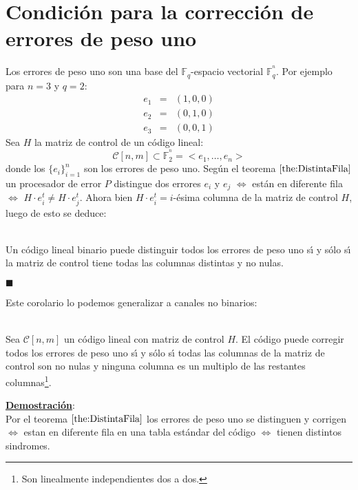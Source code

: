 %
%

\section{Condici\'on para la correcci\'on de errores de peso uno}

Los errores de peso uno son una base del $\mathbb{F}_q$-espacio vectorial
$\mathbb{F}^{^n}_q$. Por ejemplo para $n=3$ y $q=2$:
\begin{eqnarray*}
e_1&=&(1,0,0)\\
e_2&=&(0,1,0)\\
e_3&=&(0,0,1)
\end{eqnarray*}
Sea $H$ la matriz de control de un c\'odigo lineal:
\begin{displaymath}
\mathcal{C}[n,m]\subset \mathbb{F}^{^n}_2 =<e_1,\dots,e_n>
\end{displaymath}
donde los $\{e_i\}_{i=1}^n$ son los errores de peso uno. Seg\'un el teorema
$\ref{the:DistintaFila}$ un procesador de error $P$ distingue dos errores $e_i$
y $e_j$ $\Longleftrightarrow$ est\'an en diferente fila $\Longleftrightarrow$
$H \cdot e_i^t \neq H\cdot e_j^t$. Ahora bien $H\cdot e_i^t=i$-\'esima columna
de la matriz de control $H$, luego de esto se deduce:
\begin{corolario}
\ \\
Un c\'odigo lineal binario puede distinguir todos los errores de peso uno
s\'{\i} y s\'olo s\'{\i} la matriz de control tiene todas las columnas distintas
y no nulas.
\begin{flushright}
$\blacksquare$
\end{flushright}
\end{corolario}
%
Este corolario lo podemos generalizar a canales no binarios:
\begin{teorema}
\ \\
Sea $\mathcal{C}[n,m]$ un c\'odigo lineal con matriz de control $H$. El c\'odigo
puede corregir todos los errores de peso uno s\'{\i} y s\'olo s\'{\i} todas las
columnas de la matriz de control son no nulas y ninguna columna es un multiplo
de las restantes columnas\footnote{Son linealmente independientes dos a dos.}.
\end{teorema}
\underline{\textbf{Demostraci\'on}}:\\
Por el teorema $\ref{the:DistintaFila}$ los errores de peso uno se distinguen y
corrigen $\Longleftrightarrow$ estan en diferente fila en una tabla est\'andar
del c\'odigo $\Longleftrightarrow$ tienen distintos sindromes.
